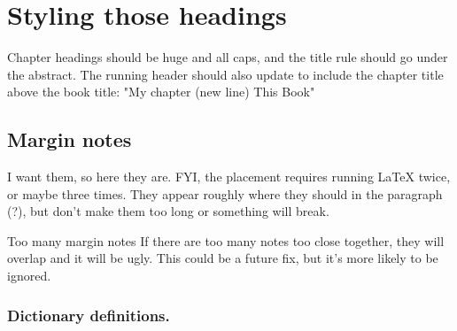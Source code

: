 \documentclass[
  letterpaper, 12pt
]{report}
\begin{document}
%
%
%
%
%
%

\chapter{Styling those headings}

Chapter headings should be huge and all caps, and the title rule should go under the abstract.  The running header should also update to include the chapter title above the book title: "My chapter (new line) This Book"

\section{Margin notes}

I want them, so here they are.  FYI, the placement requires running LaTeX twice, or maybe three times.   They appear roughly where they should in the paragraph (?), but don't make them too long or something will break. 

\begin{warnbox}{Too many margin notes}
If there are too many notes too close together, they will overlap and it will be ugly.  This could be a future fix, but it's more likely to be ignored.
\end{warnbox} 

\subsection{Dictionary definitions.}
\end{document}
